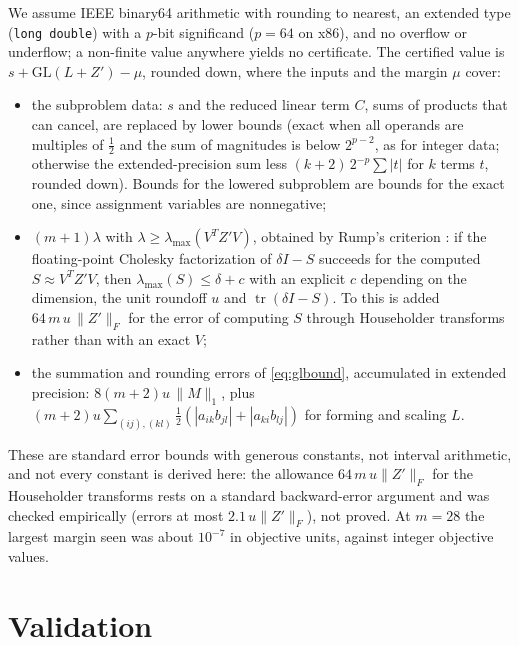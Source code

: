 \documentclass[11pt]{article}
\theoremstyle{remark}
\newcommand{\tr}{\operatorname{tr}}
\newcommand{\lmax}{\lambda_{\max}}
\newcommand{\GL}{\mathrm{GL}}
\begin{document}
We assume IEEE binary64 arithmetic with rounding to nearest, an extended type
(\texttt{long double}) with a $p$-bit significand ($p=64$ on x86), and no overflow
or underflow; a non-finite value anywhere yields no certificate. The certified
value is $s + \GL(L+Z') - \mu$, rounded down, where the inputs and the margin $\mu$
cover:
\begin{itemize}
\item[(o)] the subproblem data: $s$ and the reduced linear term $C$, sums of
  products that can cancel, are replaced by lower bounds (exact when all operands
  are multiples of $\frac12$ and the sum of magnitudes is below $2^{p-2}$, as for
  integer data; otherwise the extended-precision sum less $(k+2)\,2^{-p}\sum|t|$
  for $k$ terms $t$, rounded down). Bounds for the lowered subproblem are bounds for
  the exact one, since assignment variables are nonnegative;
\item[(i)] $(m+1)\lambda$ with $\lambda\ge\lmax(V^TZ'V)$, obtained by Rump's
  criterion \cite{rump}: if the floating-point Cholesky factorization of
  $\delta I - S$ succeeds for the computed $S \approx V^TZ'V$, then
  $\lmax(S) \le \delta + c$ with an explicit $c$ depending on the dimension, the
  unit roundoff $u$ and $\tr(\delta I - S)$. To this is added
  $64\,m\,u\,\|Z'\|_F$ for the error of computing $S$ through Householder
  transforms rather than with an exact $V$;
\item[(ii)] the summation and rounding errors of \eqref{eq:glbound}, accumulated in
  extended precision: $8(m+2)u\,\|M\|_1$, plus $(m+2)u\sum_{(ij),(kl)}
  \frac12(|a_{ik}b_{jl}|+|a_{ki}b_{lj}|)$ for forming and scaling $L$.
\end{itemize}
These are standard error bounds with generous constants, not interval arithmetic,
and not every constant is derived here: the allowance $64\,m\,u\|Z'\|_F$ for the
Householder transforms rests on a standard backward-error argument and was checked
empirically (errors at most $2.1\,u\|Z'\|_F$), not proved. At $m=28$ the largest
margin seen was about $10^{-7}$ in objective units, against integer objective
values.

\section{Validation}\label{sec:validation}
\end{document}
